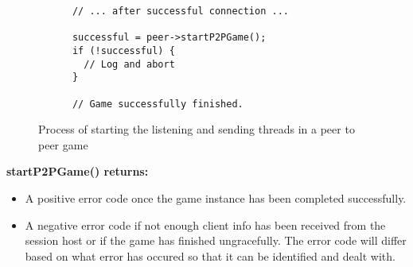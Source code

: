 \begin{figure}[!h]
  \centering
  \begin{lstlisting}
      // ... after successful connection ...

      successful = peer->startP2PGame();
      if (!successful) {
        // Log and abort
      }

      // Game successfully finished.
  \end{lstlisting}
  \caption{Process of starting the listening and sending threads in a peer to peer game}
  \label{code:peer_game}
\end{figure}
\textbf{startP2PGame() returns:}
\begin{itemize}
\item A positive error code once the game instance has been completed successfully.

\item A negative error code if not enough client info has been received from the session host or if the game has finished ungracefully. The error code will differ based on what error has occured so that it can be identified and dealt with.
\end{itemize}
